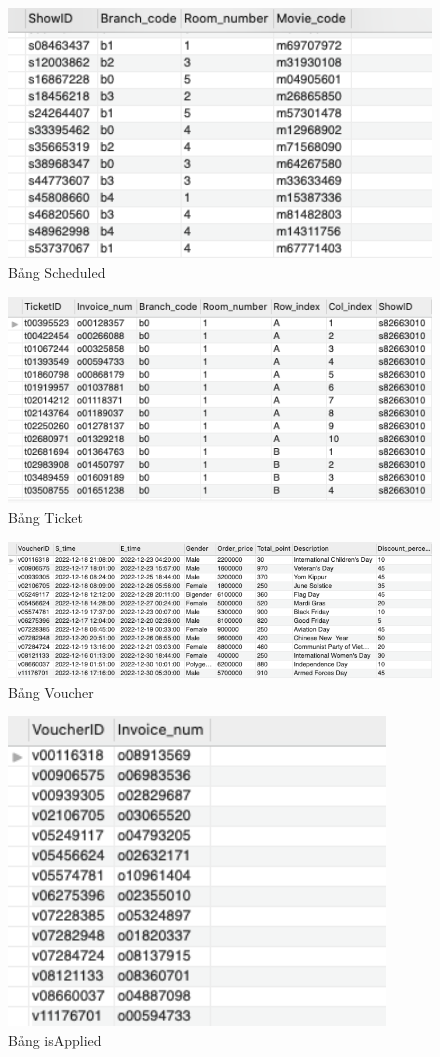 \begin{figure}[H]
    \centering
    \includegraphics[width=12cm]{images/SCHEDULED.png}
    \caption{Bảng Scheduled}
\end{figure}

\begin{figure}[H]
    \centering
    \includegraphics[width=12cm]{images/TICKET.png}
    \caption{Bảng Ticket}
\end{figure}

\begin{figure}[H]
    \centering
    \includegraphics[width=15cm]{images/VOUCHER.png}
    \caption{Bảng Voucher}
\end{figure}

\begin{figure}[H]
    \centering
    \includegraphics[width=10cm]{images/IS_APPLIED.png}
    \caption{Bảng isApplied}
\end{figure}

